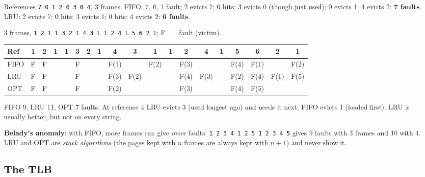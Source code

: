 \begin{eg}
References \texttt{7 0 1 2 0 3 0 4}, 3 frames. FIFO: 7, 0, 1 fault; 2 evicts 7; 0
hits; 3 evicts 0 (though just used); 0 evicts 1; 4 evicts 2: \textbf{7 faults}. LRU:
2 evicts 7; 0 hits; 3 evicts 1; 0 hits; 4 evicts 2: \textbf{6 faults}.
\end{eg}

\begin{eg}
3 frames, \texttt{1 2 1 1 3 2 1 4 3 1 1 2 4 1 5 6 2 1}; F $=$ fault (victim).
\begin{center}
\scriptsize
\setlength{\tabcolsep}{2.2pt}
\begin{tabular}{@{}l*{18}{c}@{}}
\toprule
Ref & 1 & 2 & 1 & 1 & 3 & 2 & 1 & 4 & 3 & 1 & 1 & 2 & 4 & 1 & 5 & 6 & 2 & 1 \\
\midrule
FIFO & F & F & & & F & & & F(1) & & F(2) & & F(3) & & & F(4) & F(1) & & F(2) \\
LRU & F & F & & & F & & & F(3) & F(2) & & & F(4) & F(3) & & F(2) & F(4) & F(1) & F(5) \\
OPT & F & F & & & F & & & F(2) & & & & F(3) & & & F(4) & F(5) & & \\
\bottomrule
\end{tabular}
\end{center}
FIFO 9, LRU 11, OPT 7 faults. At reference 4 LRU evicts 3 (used longest ago) and
needs it next; FIFO evicts 1 (loaded first). LRU is usually better, but not on every
string.
\end{eg}

\begin{remark}
\textbf{Belady's anomaly}: with FIFO, more frames can give \emph{more} faults:
\texttt{1 2 3 4 1 2 5 1 2 3 4 5} gives 9 faults with 3 frames and 10 with 4. LRU
and OPT are \emph{stack algorithms} (the pages kept with $n$ frames are always
kept with $n+1$) and never show it.
\end{remark}

\subsection{The TLB}
\label{sec:tlb}

